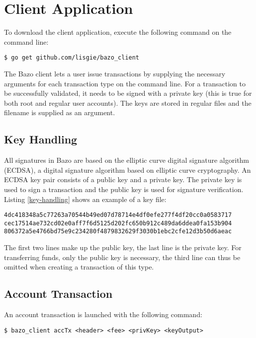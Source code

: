 \section{Client Application}
To download the client application, execute the following command on the command line:

\begin{lstlisting}
$ go get github.com/lisgie/bazo_client
\end{lstlisting}

The Bazo client lets a user issue transactions by supplying the necessary arguments for each transaction type on the command line. For a transaction to be successfully validated, it needs to be signed with a private key (this is true for both root and regular user accounts). The keys are stored in regular files and the filename is supplied as an argument.


\subsection{Key Handling}
All signatures in Bazo are based on the elliptic curve digital signature algorithm (ECDSA), a digital signature algorithm based on elliptic curve cryptography. An ECDSA key pair consists of a public key and a private key. The private key is used to sign a transaction and the public key is used for signature verification. Listing \ref{key-handling} shows an example of a key file:

\begin{lstlisting}[caption={Bazo Key File},label={key-handling}]
4dc418348a5c77263a70544b49ed07d78714e4df0efe277f4df20cc0a0583717
cec17514ae732cd02e0aff7f6d5125d202fc650b912c489da6ddea0fa153b904 
806372a5e4766bd75e9c234280f4879832629f3030b1ebc2cfe12d3b50d6aeac
\end{lstlisting}

The first two lines make up the public key, the last line is the private key. For transferring funds, only the public key is necessary, the third line can thus be omitted when creating a transaction of this type.

\subsection{Account Transaction}

An account transaction is launched with the following command: 

\begin{lstlisting}
$ bazo_client accTx <header> <fee> <privKey> <keyOutput>
\end{lstlisting}

